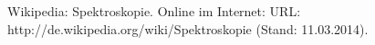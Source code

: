 \begin{thebibliography}{9}
 Wikipedia: Spektroskopie. Online im Internet: URL: http://de.wikipedia.org/wiki/Spektroskopie (Stand: 11.03.2014). 
\end{thebibliography}